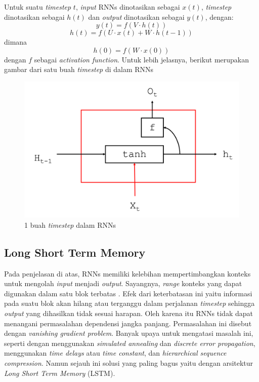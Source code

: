 Untuk suatu \textit{timestep} $ t $, \textit{input} RNNs dinotasikan sebagai $ x(t) $, \textit{timestep} dinotasikan sebagai $ h(t) $ dan \textit{output} dinotasikan sebagai $ y(t) $, dengan:
\begin{equation}
y(t) = f(V \cdot h(t))
\end{equation}
\begin{equation}
h(t) = f(U \cdot x(t) + W \cdot h(t-1))
\end{equation}
dimana
\begin{equation}
h(0) = f(W \cdot x(0))
\end{equation}
dengan $ f $ sebagai \textit{activation function}. Untuk lebih jelasnya, berikut merupakan gambar dari satu buah \textit{timestep} di dalam RNNs
\begin{figure}
	\centering
	\includegraphics[width=0.80\linewidth]{images/nodes_rnn}
	\caption{1 buah \textit{timestep} dalam RNNs}
	\label{fig:nodes_rnn}
\end{figure}

\subsection{Long Short Term Memory}
Pada penjelasan di atas, RNNs memiliki kelebihan mempertimbangkan konteks untuk mengolah \textit{input} menjadi \textit{output}. Sayangnya, \textit{range} konteks yang dapat digunakan dalam satu blok terbatas \citep{graves2012neural}. Efek dari keterbatasan ini yaitu informasi pada suatu blok akan hilang atau terganggu dalam perjalanan \textit{timestep} sehingga \textit{output} yang dihasilkan tidak sesuai harapan. Oleh karena itu RNNs tidak dapat menangani permasalahan dependensi jangka panjang. Permasalahan ini disebut dengan \textit{vanishing gradient problem}. Banyak upaya untuk mengatasi masalah ini, seperti dengan menggunakan \textit{simulated annealing} dan \textit{discrete error propagation}, menggunakan \textit{time delays} atau \textit{time constant}, dan \textit{hierarchical sequence compression}. Namun sejauh ini solusi yang paling bagus yaitu dengan arsitektur \textit{Long Short Term Memory} (LSTM).

